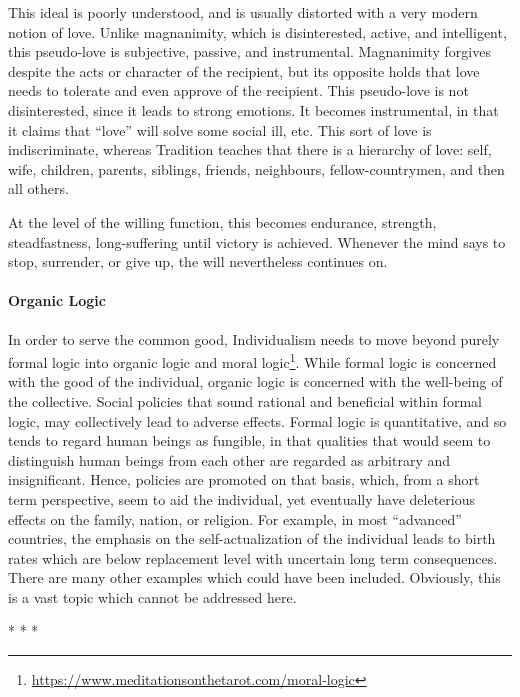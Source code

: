 This ideal is poorly understood, and is usually distorted with a very modern notion of love. Unlike magnanimity, which is disinterested, active, and intelligent, this pseudo-love is subjective, passive, and instrumental. Magnanimity forgives despite the acts or character of the recipient, but its opposite holds that love needs to tolerate and even approve of the recipient. This pseudo-love is not disinterested, since it leads to strong emotions. It becomes instrumental, in that it claims that ``love'' will solve some social ill, etc. This sort of love is indiscriminate, whereas Tradition teaches that there is a hierarchy of love: self, wife, children, parents, siblings, friends, neighbours, fellow-countrymen, and then all others.

At the level of the willing function, this becomes endurance, strength, steadfastness, long-suffering until victory is achieved. Whenever the mind says to stop, surrender, or give up, the will nevertheless continues on.

\paragraph{Organic Logic}


In order to serve the common good, Individualism needs to move beyond purely formal logic into organic logic and moral logic\footnote{\url{https://www.meditationsonthetarot.com/moral-logic}}. While formal logic is concerned with the good of the individual, organic logic is concerned with the well-being of the collective. Social policies that sound rational and beneficial within formal logic, may collectively lead to adverse effects. Formal logic is quantitative, and so tends to regard human beings as fungible, in that qualities that would seem to distinguish human beings from each other are regarded as arbitrary and insignificant. Hence, policies are promoted on that basis, which, from a short term perspective, seem to aid the individual, yet eventually have deleterious effects on the family, nation, or religion. For example, in most ``advanced'' countries, the emphasis on the self-actualization of the individual leads to birth rates which are below replacement level with uncertain long term consequences. There are many other examples which could have been included. Obviously, this is a vast topic which cannot be addressed here.



\begin{center}* * *\end{center}

